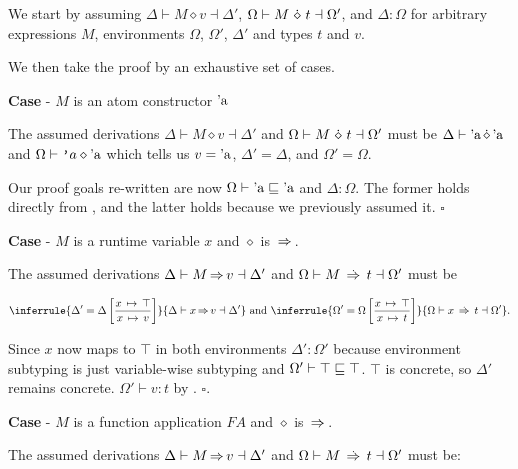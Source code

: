 \documentclass[12pt,twoside]{report}
\begin{document}
We start by assuming $\Delta \vdash M \diamond v \dashv \Delta'$, $\Omega \vdash M \,\, \dot{\diamond} \,\, t \dashv \Omega'$, and $\Delta : \Omega$ for arbitrary expressions $M$, environments $\Omega$, $\Omega'$,  $\Delta'$ and types $t$ and $v$.

We then take the proof by an exhaustive set of cases.

\textbf{Case} - $M$ is an atom constructor $\text{'a}$

The assumed derivations $\Delta \vdash M \diamond v \dashv \Delta'$ and $\Omega \vdash M \,\, \dot{\diamond} \,\, t \dashv \Omega'$ must be $\Delta \vdash \text{'a} \, \dot{\diamond} \, \text{'a}$ and $\Omega \vdash \text{\texttt{'}}a \diamond \text{'a}$ which tells us $v = \text{'a}$, $\Delta' = \Delta$, and $\Omega' = \Omega$.

Our proof goals re-written are now $\Omega \vdash \text{'a} \sqsubseteq \text{'a}$ and $\Delta: \Omega$. The former holds directly from , and the latter holds because we previously assumed it. \hfill $\square$

\textbf{Case} - $M$ is a runtime variable $x$ and $\diamond$ is $\,{\Rightarrow}\,$.

The assumed derivations $\Delta \vdash M \,{\Rightarrow}\, v \dashv \Delta'$ and $\Omega \vdash M \,\stackrel{.}{\Rightarrow}\, t \dashv \Omega'$ must be

\begin{equation}
    \inferrule{
    \Delta' = \Delta\left[\dfrac{\absmap{x}{\top}}{\absmap{x}{v}}\right]
    }{
    \Delta \vdash x \movearrowconc v \dashv \Delta'
    }
    \text{ and }
    \inferrule{
    \Omega' = \Omega\left[\dfrac{\absmap{x}{\top}}{\absmap{x}{t}}\right]
    }{
    \Omega \vdash x \movearrowabs t \dashv \Omega'
    }.
\end{equation}

Since $x$ now maps to $\top$ in both environments $\Delta': \Omega'$ because environment subtyping is just variable-wise subtyping and $\Omega' \vdash \top \sqsubseteq \top$. $\top$ is concrete, so $\Delta'$ remains concrete. $\Omega' \vdash v:t$ by \odef{:}{\Omega}. \hfill $\square$.

\textbf{Case} - $M$ is a function application $F A$ and $\diamond$ is $\,{\Rightarrow}\,$.

The assumed derivations $\Delta \vdash M \,{\Rightarrow}\, v \dashv \Delta'$ and $\Omega \vdash M \,\stackrel{.}{\Rightarrow}\, t \dashv \Omega'$ must be:
\end{document}
